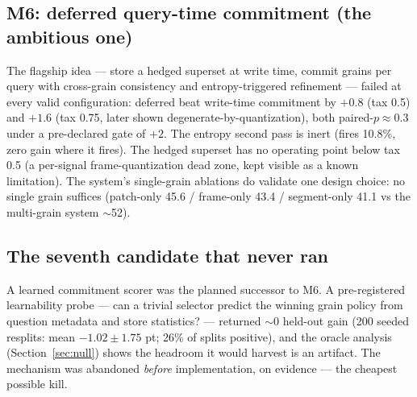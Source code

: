 \subsection{M6: deferred query-time commitment (the ambitious one)}
The flagship idea — store a hedged superset at write time, commit grains per query with cross-grain consistency and entropy-triggered refinement — failed at every valid configuration: deferred beat write-time commitment by $+0.8$ (tax 0.5) and $+1.6$ (tax 0.75, later shown degenerate-by-quantization), both paired-$p \approx 0.3$ under a pre-declared gate of $+2$. The entropy second pass is inert (fires 10.8\%, zero gain where it fires). The hedged superset has no operating point below tax 0.5 (a per-signal frame-quantization dead zone, kept visible as a known limitation). The system's single-grain ablations do validate one design choice: no single grain suffices (patch-only 45.6 / frame-only 43.4 / segment-only 41.1 vs the multi-grain system $\sim$52).

\subsection{The seventh candidate that never ran}
A learned commitment scorer was the planned successor to M6. A pre-registered learnability probe — can a trivial selector predict the winning grain policy from question metadata and store statistics? — returned $\sim$0 held-out gain (200 seeded resplits: mean $-1.02\pm1.75$ pt; 26\% of splits positive), and the oracle analysis (Section~\ref{sec:null}) shows the headroom it would harvest is an artifact. The mechanism was abandoned \emph{before} implementation, on evidence — the cheapest possible kill.
